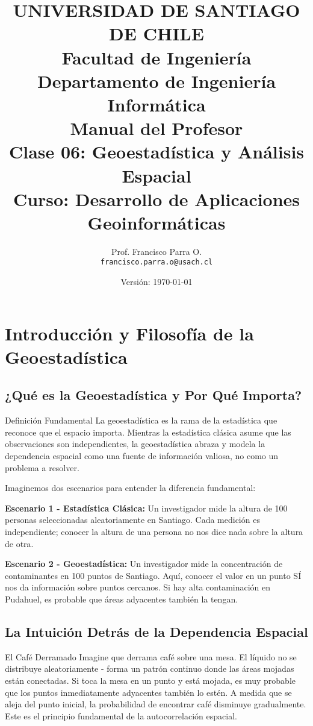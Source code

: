 \documentclass[12pt,a4paper]{article}
\title{
    \vspace{-2cm}
    \Large{UNIVERSIDAD DE SANTIAGO DE CHILE} \\
    \large{Facultad de Ingeniería} \\
    \large{Departamento de Ingeniería Informática} \\
    \vspace{1cm}
    \LARGE{\textbf{Manual del Profesor}} \\
    \Large{\textbf{Clase 06: Geoestadística y Análisis Espacial}} \\
    \vspace{0.5cm}
    \large{Curso: Desarrollo de Aplicaciones Geoinformáticas}
}
\author{
    Prof. Francisco Parra O. \\
    \texttt{francisco.parra.o@usach.cl}
}
\date{Versión: \today}
\begin{document}
\maketitle
\thispagestyle{empty}
\newpage

\tableofcontents
\newpage

\section{Introducción y Filosofía de la Geoestadística}

\subsection{¿Qué es la Geoestadística y Por Qué Importa?}

\begin{conceptbox}{Definición Fundamental}
La geoestadística es la rama de la estadística que reconoce que el espacio importa. Mientras la estadística clásica asume que las observaciones son independientes, la geoestadística abraza y modela la dependencia espacial como una fuente de información valiosa, no como un problema a resolver.
\end{conceptbox}

Imaginemos dos escenarios para entender la diferencia fundamental:

\textbf{Escenario 1 - Estadística Clásica:} Un investigador mide la altura de 100 personas seleccionadas aleatoriamente en Santiago. Cada medición es independiente; conocer la altura de una persona no nos dice nada sobre la altura de otra.

\textbf{Escenario 2 - Geoestadística:} Un investigador mide la concentración de contaminantes en 100 puntos de Santiago. Aquí, conocer el valor en un punto SÍ nos da información sobre puntos cercanos. Si hay alta contaminación en Pudahuel, es probable que áreas adyacentes también la tengan.

\subsection{La Intuición Detrás de la Dependencia Espacial}

\begin{analogia}{El Café Derramado}
Imagine que derrama café sobre una mesa. El líquido no se distribuye aleatoriamente - forma un patrón continuo donde las áreas mojadas están conectadas. Si toca la mesa en un punto y está mojada, es muy probable que los puntos inmediatamente adyacentes también lo estén. A medida que se aleja del punto inicial, la probabilidad de encontrar café disminuye gradualmente. Este es el principio fundamental de la autocorrelación espacial.
\end{analogia}
\end{document}
